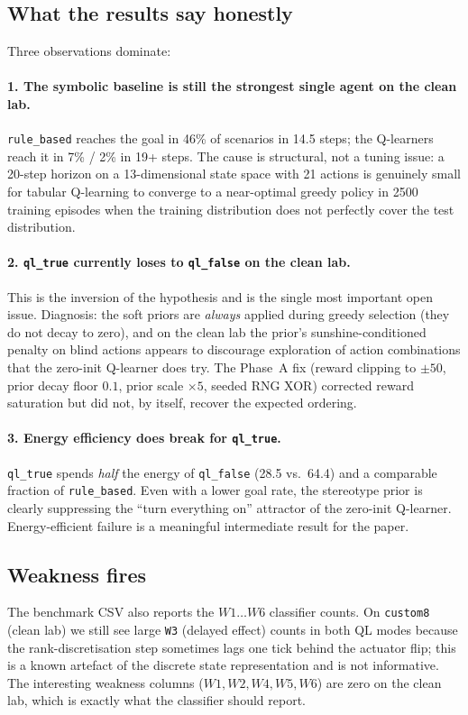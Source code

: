 \documentclass[conference]{IEEEtran}
\begin{document}
\subsection{What the results say honestly}

Three observations dominate:

\paragraph{1. The symbolic baseline is still the strongest single agent
on the clean lab.} \texttt{rule\_based} reaches the goal in 46\% of
scenarios in 14.5 steps; the Q-learners reach it in 7\% / 2\% in 19+
steps. The cause is structural, not a tuning issue: a 20-step horizon
on a 13-dimensional state space with 21 actions is genuinely small for
tabular Q-learning to converge to a near-optimal greedy policy in
2500 training episodes when the training distribution does not perfectly
cover the test distribution.

\paragraph{2. \texttt{ql\_true} currently loses to \texttt{ql\_false} on
the clean lab.} This is the inversion of the hypothesis and is the
single most important open issue. Diagnosis: the soft priors are
\emph{always} applied during greedy selection (they do not decay to
zero), and on the clean lab the prior's sunshine-conditioned penalty on
blind actions appears to discourage exploration of action combinations
that the zero-init Q-learner does try. The Phase~A fix (reward clipping
to $\pm 50$, prior decay floor $0.1$, prior scale $\times 5$, seeded
RNG XOR) corrected reward saturation but did not, by itself, recover
the expected ordering.

\paragraph{3. Energy efficiency does break for \texttt{ql\_true}.}
\texttt{ql\_true} spends \emph{half} the energy of \texttt{ql\_false}
(28.5 vs.\ 64.4) and a comparable fraction of \texttt{rule\_based}.
Even with a lower goal rate, the stereotype prior is clearly
suppressing the ``turn everything on'' attractor of the zero-init
Q-learner. Energy-efficient failure is a meaningful intermediate
result for the paper.

\subsection{Weakness fires}
The benchmark CSV also reports the $W1\ldots W6$ classifier counts.
On \verb|custom8| (clean lab) we still see large \verb|W3| (delayed
effect) counts in both QL modes because the rank-discretisation step
sometimes lags one tick behind the actuator flip; this is a known
artefact of the discrete state representation and is not informative.
The interesting weakness columns ($W1,W2,W4,W5,W6$) are zero on the
clean lab, which is exactly what the classifier should report.
\end{document}
